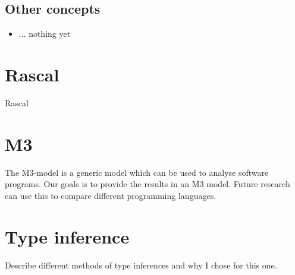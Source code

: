 \documentclass[../main.tex]{subfiles}
\begin{document}
    
    \subsection{Other concepts}
    \begin{itemize}
        \item ... nothing yet
    \end{itemize}

    
    \section{Rascal}
    \Gls{Rascal} 

    \section{M3}
    The M3-model is a generic model which can be used to analyse software programs.
    Our goals is to provide the results in an M3 model.
    Future research can use this to compare different programming languages.
    
    \section{Type inference}
    
    Describe different methods of type inferences and why I chose for this one.
    
\end{document}
